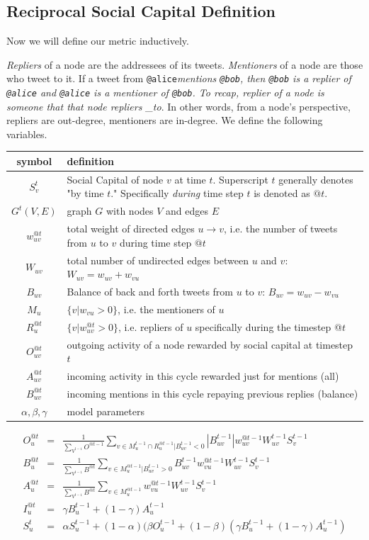 \documentclass[10pt,oneside]{memoir}
\begin{document}
\begin{Spacing}{2}
\pagebreak \section{Reciprocal Social Capital Definition}
\label{reciprocalsocialcapitaldefinition}

Now we will define our metric inductively.


{\itshape Repliers} of a node are the addressees of its tweets. {\itshape Mentioners} of a node are those who tweet to it. If a tweet from \texttt{@alice}{\itshape mentions \texttt{@bob}, then \texttt{@bob} is a replier of \texttt{@alice} and \texttt{@alice} is a mentioner of \texttt{@bob}. To recap, replier of a node is someone that that node repliers \_to}. In other words, from a node's perspective, repliers are out-degree, mentioners are in-degree.  We define the following variables.



\begin{tabular}{|c|p{4in}|}
\hline 
symbol & definition\tabularnewline
\hline
\hline 
$S_{v}^{t}$ & Social Capital of node $v$ at time $t$. Superscript $t$ generally
denotes "by time $t$." Specifically \emph{during} time step
$t$ is denoted as $@t$.\tabularnewline
\hline 
$G^{t}(V,E)$ & graph $G$ with nodes $V$ and edges $E$\tabularnewline
\hline 
$w_{uv}^{@t}$ & total weight of directed edges $u\rightarrow v$, i.e. the number
of tweets from $u$ to $v$ during time step $@t$\tabularnewline
\hline 
$W_{uv}$ & total number of undirected edges between $u$ and $v$: $W_{uv}=w_{uv}+w_{vu}$\tabularnewline
\hline 
$B_{uv}$ & Balance of back and forth tweets from $u$ to $v$: $B_{uv}=w_{uv}-w_{vu}$\tabularnewline
\hline 
$M_{u}$ & $\{v|w_{vu}>0\}$, i.e. the mentioners of $u$\tabularnewline
\hline 
$R_{u}^{@t}$ & $\{v|w_{uv}^{@t}>0\}$, i.e. repliers of $u$ specifically during
the timestep @$t$\tabularnewline
\hline 
$O_{uv}^{@t}$ & outgoing activity of a node rewarded by social capital at timestep
$t$\tabularnewline
\hline 
$A_{uv}^{@t}$ & incoming activity in this cycle rewarded just for mentions (all)\tabularnewline
\hline 
$B_{uv}^{@t}$ & incoming mentions in this cycle repaying previous replies (balance)\tabularnewline
\hline 
$\alpha,\beta,\gamma$ & model parameters\tabularnewline
\hline
\end{tabular}

\begin{eqnarray}
O_{u}^{@t} & = & \frac{1}{\sum_{V^{t-1}}O^{@t-1}}\sum_{v\in M_{u}^{t-1}\cap R_{u}^{@t-1}|B_{uv}^{t-1}<0}|B_{uv}^{t-1}|w_{uv}^{@t-1}W_{uv}^{t-1}S_{v}^{t-1}\\
B_{u}^{@t} & = & \frac{1}{\sum_{V^{t-1}}B^{@t}}\sum_{v\in M_{u}^{@t-1}|B_{uv}^{t-1}>0}B_{uv}^{t-1}w_{vu}^{@t-1}W_{uv}^{t-1}S_{v}^{t-1}\\
A_{u}^{@t} & = & \frac{1}{\sum_{V^{t-1}}B^{@t}}\sum_{v\in M_{u}^{@t-1}}w_{vu}^{@t-1}W_{uv}^{t-1}S_{v}^{t-1}\\
I_{u}^{@t} & = & \gamma B_{u}^{t-1}+(1-\gamma)A_{u}^{t-1}\\
S_{u}^{t} & = & \alpha S_{u}^{t-1}+(1-\alpha)(\beta O_{u}^{t-1}+(1-\beta)(\gamma B_{u}^{t-1}+(1-\gamma)A_{u}^{t-1})
\end{eqnarray}


\end{Spacing}
\end{document}
